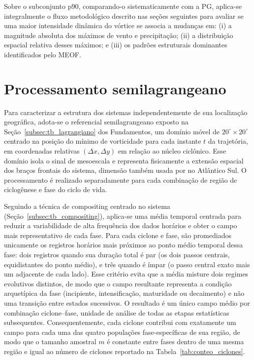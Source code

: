 Sobre o subconjunto p90, comparando-o sistematicamente com a PG, aplica-se integralmente o fluxo metodológico descrito nas seções seguintes para avaliar se uma maior intensidade dinâmica do vórtice se associa a mudanças em: (i) a magnitude absoluta dos máximos de vento e precipitação; (ii) a distribuição espacial relativa desses máximos; e (iii) os padrões estruturais dominantes identificados pelo MEOF.


\section{Processamento semilagrangeano}\label{sec:procesamiento_lagrangiano}

Para caracterizar a estrutura dos sistemas independentemente de sua localização geográfica, adota-se o referencial semilagrangeano exposto na Seção~\ref{subsec:tb_lagrangiano} dos Fundamentos, um domínio móvel de $20^{\circ} \times 20^{\circ}$ centrado na posição do mínimo de vorticidade para cada instante $t$ da trajetória, em coordenadas relativas $(\Delta x, \Delta y)$ em relação ao núcleo ciclônico. Esse domínio isola o sinal de mesoescala e representa fisicamente a extensão espacial dos braços frontais do sistema, dimensão também usada por \citet{cardoso2022synoptic} no Atlântico Sul. O processamento é realizado separadamente para cada combinação de região de ciclogênese e fase do ciclo de vida.

Seguindo a técnica de compositing centrado no sistema (Seção~\ref{subsec:tb_compositing}), aplica-se uma média temporal centrada para reduzir a variabilidade de alta frequência dos dados horários e obter o campo mais representativo de cada fase. Para cada ciclone e fase, são promediados unicamente os registros horários mais próximos ao ponto médio temporal dessa fase: dois registros quando sua duração total é par (os dois passos centrais, equidistantes do ponto médio), e três quando é ímpar (o passo central exato mais um adjacente de cada lado). Esse critério evita que a média misture dois regimes evolutivos distintos, de modo que o campo resultante representa a condição arquetípica da fase (incipiente, intensificação, maturidade ou decaimento) e não uma transição entre estados sucessivos. O resultado é um único campo médio por combinação ciclone--fase, unidade de análise de todas as etapas estatísticas subsequentes. Consequentemente, cada ciclone contribui com exatamente um campo para cada uma das quatro populações fase-específicas de sua região, de modo que o tamanho amostral $m$ é constante entre fases dentro de uma mesma região e igual ao número de ciclones reportado na Tabela~\ref{tab:conteo_ciclones}.

